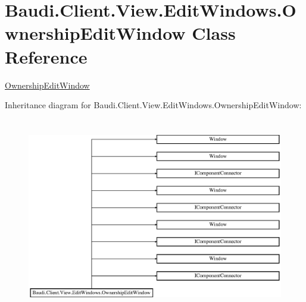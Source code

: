 \hypertarget{class_baudi_1_1_client_1_1_view_1_1_edit_windows_1_1_ownership_edit_window}{}\section{Baudi.\+Client.\+View.\+Edit\+Windows.\+Ownership\+Edit\+Window Class Reference}
\label{class_baudi_1_1_client_1_1_view_1_1_edit_windows_1_1_ownership_edit_window}


\hyperlink{class_baudi_1_1_client_1_1_view_1_1_edit_windows_1_1_ownership_edit_window}{Ownership\+Edit\+Window}  


Inheritance diagram for Baudi.\+Client.\+View.\+Edit\+Windows.\+Ownership\+Edit\+Window\+:\begin{figure}[H]
\begin{center}
\leavevmode
\includegraphics[height=8.615385cm]{class_baudi_1_1_client_1_1_view_1_1_edit_windows_1_1_ownership_edit_window}
\end{center}
\end{figure}
